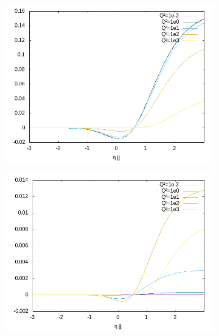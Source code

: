 \begin{figure}[ht!]
\centering
\begin{subfigure}[t]{.3\textwidth}
	\includegraphics[width=\textwidth]{../../img2/partonic/cq1_VV_F2}
\end{subfigure}%
\begin{subfigure}[t]{.3\textwidth}
	\includegraphics[width=\textwidth]{../../img2/partonic/cq1_VV_FL}
\end{subfigure}%
\begin{subfigure}[t]{.3\textwidth}

\end{subfigure}
\end{figure}
